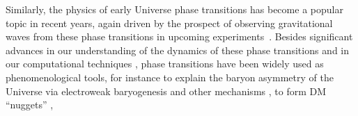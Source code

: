 \documentclass[
onecolumn, %
11pt, %
tightenlines,
superscriptaddress, %
nofootinbib, %
preprintnumbers, %
prd %
]{revtex4-1}
\begin{document}
Similarly, the physics of early Universe phase transitions has become a popular topic in recent years, again driven by the prospect of observing gravitational waves from these phase transitions in upcoming experiments~\cite{
  Hogan:1983ixn,
  Witten:1984rs,
  Turner:1990rc,
  Schwaller:2015tja,  %
  Caprini:2015zlo,    %
  Caprini:2019egz,    %
  Hindmarsh:2020hop}. %
Besides significant advances in our understanding of the dynamics of these phase transitions \cite{
  Bodeker:2009qy,     %
  Bodeker:2017cim,    %
  Espinosa:2019hbm,   %
  Mukhanov:2021ggy,   %
  Espinosa:2021qeo}   %
and in our computational techniques \cite{
  Wainwright:2011kj,  %
  Masoumi:2017trx,    %
  Espinosa:2018hue,   %
  Espinosa:2018voj,   %
  Espinosa:2018szu,   %
  Guada:2018jek,      %
  Guada:2020xnz},     %
phase transitions have been widely used as phenomenological tools, for instance to explain the baryon asymmetry of the Universe via electroweak baryogenesis \cite{
    Kuzmin:1985mm,        %
    Shaposhnikov:1986jp,  %
    Shaposhnikov:1987tw,  %
    Carena:1996wj,
    Riotto:1998zb,        %
    Huber:2006wf,         %
    Cline:2006ts,         %
    Morrissey:2012db,     %
    Vaskonen:2016yiu,     %
    Garbrecht:2018mrp,    %
    deVries:2018tgs,      %
    Cline:2020jre,        %
    Fuchs:2020pun}        %
and other mechanisms \cite{
    Dutta:2006pt,         %
    Shelton:2010ta,       %
    Dutta:2010va,         %
    Hall:2019ank,         %
    Cline:2017qpe,        %
    Huang:2017kzu,
    Arakawa:2021wgz},     %
to form DM ``nuggets'' \cite{
  Hong:2020est,       %
  Gross:2021qgx,      %
  Asadi:2021pwo},
\end{document}
